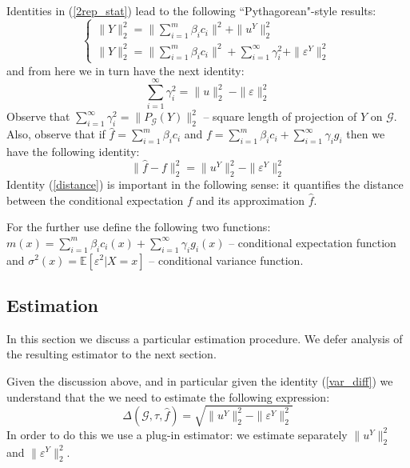 \documentclass[12pt]{article}
\theoremstyle{plain}
\begin{document}
Identities in (\ref{2rep_stat}) lead to the following ``Pythagorean"-style results:
\begin{equation}
\begin{cases}
\| Y\|_2^2 = \|  \sum_{i=1}^m \beta_i c_i \|^2 + \| u^Y\|_2^2\\
\| Y\|_2^2 = \|  \sum_{i=1}^m \beta_i c_i \|^2 + \sum_{i=1}^{\infty} \gamma_i^2+ \| \varepsilon^Y\|_2^2
\end{cases}
\end{equation}
and from here we in turn have the next identity:
\begin{equation}\label{var_diff}
\sum_{i=1}^{\infty} \gamma_i^2 =  \| u\|_2^2\ -  \| \varepsilon\|_2^2
\end{equation}
Observe that $\sum_{i=1}^{\infty} \gamma_i^2  = \|P_{\mathcal{G}}(Y)\|_2^2$ -- square length of projection of $Y$ on $\mathcal{G}$. Also, observe that if $\hat f = \sum_{i=1}^m \beta_i c_i$ and $f =  \sum_{i=1}^m \beta_i c_i +\sum_{i=1}^{\infty} \gamma_i g_i$ then we have the following identity:
\begin{equation}\label{distance}
\|\hat f - f\|_2^2 = \|u^Y\|_2^2 -  \| \varepsilon^Y\|_2^2
\end{equation}
Identity (\ref{distance}) is important in the following sense: it quantifies the distance between the conditional expectation $f$ and its approximation $\hat f$.

For the further use define the following two functions: $m(x) = \sum_{i=1}^m\beta_ic_i(x) + \sum_{i=1}^{\infty} \gamma_ig_i(x)$ -- conditional expectation function and $\sigma^{2}(x) = \mathbb{E}[\varepsilon^2|X=x]$ -- conditional variance function.

\subsection{Estimation}\label{estimation}
In this section we discuss a particular estimation procedure. We defer analysis of the resulting estimator to the next section.

Given the discussion above, and in particular given the identity (\ref{var_diff}) we understand that the we need to estimate the following expression:
\begin{equation}
\Delta(\mathcal{G}, \tau,\hat f) = \sqrt{\| u^Y\|_2^2-\|\varepsilon^Y\|_2^2}
\end{equation}
In order to do this we use a plug-in estimator: we estimate separately $\|u^Y\|_2^2$ and $\|\varepsilon^Y\|_2^2$. 
\end{document}
